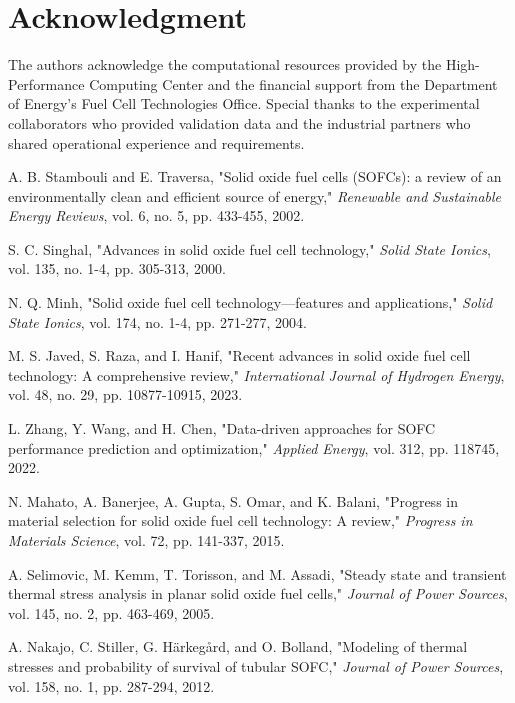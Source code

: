 \documentclass[conference]{IEEEtran}
\begin{document}
\section*{Acknowledgment}

The authors acknowledge the computational resources provided by the High-Performance Computing Center and the financial support from the Department of Energy's Fuel Cell Technologies Office. Special thanks to the experimental collaborators who provided validation data and the industrial partners who shared operational experience and requirements.

\begin{thebibliography}{99}

A. B. Stambouli and E. Traversa, "Solid oxide fuel cells (SOFCs): a review of an environmentally clean and efficient source of energy," \textit{Renewable and Sustainable Energy Reviews}, vol. 6, no. 5, pp. 433-455, 2002.

S. C. Singhal, "Advances in solid oxide fuel cell technology," \textit{Solid State Ionics}, vol. 135, no. 1-4, pp. 305-313, 2000.

N. Q. Minh, "Solid oxide fuel cell technology—features and applications," \textit{Solid State Ionics}, vol. 174, no. 1-4, pp. 271-277, 2004.

M. S. Javed, S. Raza, and I. Hanif, "Recent advances in solid oxide fuel cell technology: A comprehensive review," \textit{International Journal of Hydrogen Energy}, vol. 48, no. 29, pp. 10877-10915, 2023.

L. Zhang, Y. Wang, and H. Chen, "Data-driven approaches for SOFC performance prediction and optimization," \textit{Applied Energy}, vol. 312, pp. 118745, 2022.

N. Mahato, A. Banerjee, A. Gupta, S. Omar, and K. Balani, "Progress in material selection for solid oxide fuel cell technology: A review," \textit{Progress in Materials Science}, vol. 72, pp. 141-337, 2015.

A. Selimovic, M. Kemm, T. Torisson, and M. Assadi, "Steady state and transient thermal stress analysis in planar solid oxide fuel cells," \textit{Journal of Power Sources}, vol. 145, no. 2, pp. 463-469, 2005.

A. Nakajo, C. Stiller, G. Härkegård, and O. Bolland, "Modeling of thermal stresses and probability of survival of tubular SOFC," \textit{Journal of Power Sources}, vol. 158, no. 1, pp. 287-294, 2012.


\end{thebibliography}
\end{document}

